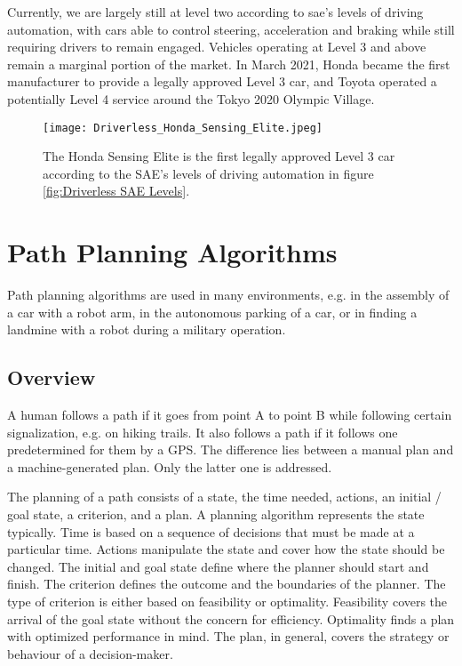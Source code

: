 Currently, we are largely still at level two according to \acrshort{sae}'s levels of driving automation, with cars able to control steering, acceleration and braking while still requiring drivers to remain engaged. Vehicles operating at Level 3 and above remain a marginal portion of the market. \cite{driverless_whats_the_status_of_self_driving_cars}
In March 2021, Honda became the first manufacturer to provide a legally approved Level 3 car, and Toyota operated a potentially Level 4 service around the Tokyo 2020 Olympic Village. \cite{driverless_honda_sensing_elite} \cite{driverless_toyota_olympics}
\begin{figure}[H]
    \centering
    \texttt{[image: Driverless\_Honda\_Sensing\_Elite.jpeg]}
    \caption{The Honda Sensing Elite is the first legally approved Level 3 car according to the SAE's levels of driving automation in figure \ref{fig:Driverless SAE Levels}.}
    \label{fig:Driverless Honda Sensing Elite}
\end{figure}

\pagebreak

\section{Path Planning Algorithms} \label{sec:Path Planning Algorithms} 
Path planning algorithms are used in many environments, e.g. in the assembly of a car with a robot arm, in the autonomous parking of a car, or in finding a landmine with a robot during a military operation.

\subsection{Overview} \label{sec:Overview Path Planning Algorithms}
A human follows a path if it goes from point A to point B while following certain signalization, e.g. on hiking trails. It also follows a path if it follows one predetermined for them by a GPS. The difference lies between a manual plan and a machine-generated plan. Only the latter one is addressed.

The planning of a path consists of a state, the time needed, actions, an initial / goal state, a criterion, and a plan. A planning algorithm represents the state typically. Time is based on a sequence of decisions that must be made at a particular time. Actions manipulate the state and cover how the state should be changed. The initial and goal state define where the planner should start and finish.
The criterion defines the outcome and the boundaries of the planner. The type of criterion is either based on feasibility or optimality. Feasibility covers the arrival of the goal state without the concern for efficiency. Optimality finds a plan with optimized performance in mind. The plan, in general, covers the strategy or behaviour of a decision-maker. \cite{planning_algorithms_steven_m_lavalle}


